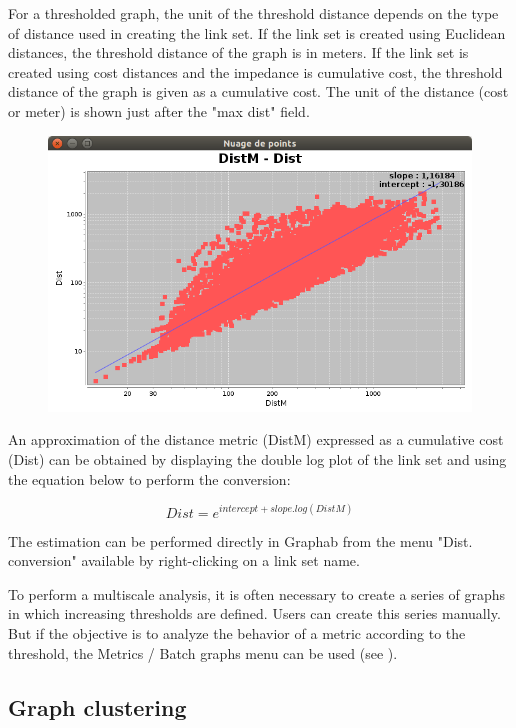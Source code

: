 \documentclass{article}
\begin{document}
For a thresholded graph, the unit of the threshold distance depends on the type of distance used in creating the link set. If the link set is created using Euclidean distances, the threshold distance of the graph is in meters. If the link set is created using cost distances and the impedance is cumulative cost, the threshold distance of the graph is given as a cumulative cost. The unit of the distance (cost or meter) is shown just after the "max dist" field.

\begin{figure}[H]
	\includegraphics[scale=0.5]{img/manual-fr_img7.png}
\end{figure}

An approximation of the distance metric (DistM) expressed as a cumulative cost (Dist) can be obtained by displaying the double log plot of the link set and using the equation below to perform the conversion:

$$Dist = e^{intercept + slope . log(DistM)}$$

The estimation can be performed directly in Graphab from the menu "Dist. conversion" available by right-clicking on a link set name.

To perform a multiscale analysis, it is often necessary to create a series of graphs in which increasing thresholds are defined. Users can create this series manually. But if the objective is to analyze the behavior of a metric according to the threshold, the Metrics / Batch graphs menu can be used (see ).


\subsection{Graph clustering}
\end{document}
